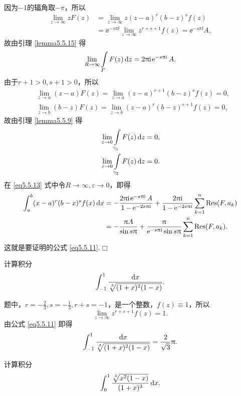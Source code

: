因为$-1$的辐角取$-\pi$，所以
\begin{align*}
\lim_{z\to\infty}zF(z)&=\lim_{z\to\infty}z(z-a)^r(b-z)^sf(z)\\
&=\ee^{-s\pi\ii}\lim_{z\to\infty}z^{r+s+1}f(z)=\ee^{-s\pi\ii}A,
\end{align*}
故由引理 \ref{lemma5.5.15} 得
\[\lim_{R\to\infty}\int\limits_{\varGamma}F(z)\mathop{}\!\mathrm dz=2\uppi\mathrm i\operatorname{\!\!\;\mathrm e}^{-s\uppi\mathrm i}A.\]
由于$r+1>0,s+1>0$，所以
\begin{align*}
&\lim_{z\to a}(z-a)F(z)=\lim_{z\to a}(z-a)^{r+1}(b-z)^sf(z)=0,\\
&\lim_{z\to b}(b-z)F(z)=\lim_{z\to b}(z-a)^{r}(b-z)^{s+1}f(z)=0,
\end{align*}
故由引理 \ref{lemma5.5.9} 得
\begin{align*}
&\lim_{\varepsilon\to0}\int\limits_{\gamma_1}F(z)\mathop{}\!\mathrm dz=0,\\
&\lim_{\varepsilon\to0}\int\limits_{\gamma_2}F(z)\mathop{}\!\mathrm dz=0.
\end{align*}
在 \eqref{eq5.5.13} 式中令$R\to\infty,\varepsilon\to0$，即得
\begin{align*}
\int_a^b(x-a)^r(b-x)^sf(x)\dx&=-\frac{2\pi\ii\ee^{-s\pi\ii}A}{1-\ee^{-2s\pi\ii}}
+\frac{2\pi\ii}{1-\ee^{-2s\pi\ii}}\sum_{k=1}^n\Res(F,a_k)\\
&=-\frac{\pi A}{\sin s\pi}+\frac\pi{\ee^{-s\pi\ii}\sin
s\pi}\sum_{k=1}^n\Res(F,a_k).
\end{align*}
这就是要证明的公式 \eqref{eq5.5.11}.\hfill$\Box$
\begin{example}\label{exam5.5.16}
计算积分
\[\int_{-1}^1\frac{\dx}{\sqrt[\leftroot{-1}\uproot{2}3]{(1+x)^2(1-x)}}.\]
\end{example}
\begin{solution}
题中，$r=-\frac23,s=-\frac13,r+s=-1$，是一个整数，$f(z)\equiv1$，所以
\[\lim_{z\to\infty}z^{r+s+1}f(z)=1.\]
由公式 \eqref{eq5.5.11} 即得
\begin{equation*}
\int_{-1}^1\frac{\dx}{\sqrt[\leftroot{-1}\uproot{2}3]{(1+x)^2(1-x)}}=\frac2{\sqrt3}\pi.
\end{equation*}
\end{solution}
\begin{example}\label{exam5.5.17}
计算积分
\[\int_0^1\frac{\sqrt[\leftroot{-1}\uproot{2}3]{x^2(1-x)}}{(1+x)^3}\dx.\]
\end{example}
